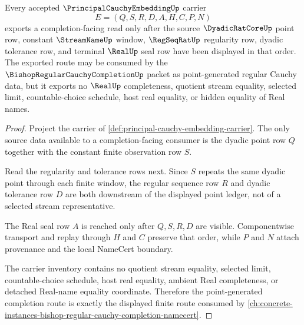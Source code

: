 \begin{theorem}
\label{thm:principal-cauchy-embedding-finite-route}
Every accepted $\PrincipalCauchyEmbeddingUp$ carrier
$$
E=(Q,S,R,D,A,H,C,P,N)
$$
exports a completion-facing read only after the source $\DyadicRatCoreUp$ point row, constant $\StreamNameUp$ window, $\RegSeqRatUp$ regularity row, dyadic tolerance row, and terminal $\RealUp$ seal row have been displayed in that order. The exported route may be consumed by the $\BishopRegularCauchyCompletionUp$ packet as point-generated regular Cauchy data, but it exports no $\RealUp$ completeness, quotient stream equality, selected limit, countable-choice schedule, host real equality, or hidden equality of Real names.
\end{theorem}
\begin{proof}
Project the carrier of \autoref{def:principal-cauchy-embedding-carrier}. The only source data available to a completion-facing consumer is the dyadic point row $Q$ together with the constant finite observation row $S$.

Read the regularity and tolerance rows next. Since $S$ repeats the same dyadic point through each finite window, the regular sequence row $R$ and dyadic tolerance row $D$ are both downstream of the displayed point ledger, not of a selected stream representative.

The Real seal row $A$ is reached only after $Q,S,R,D$ are visible. Componentwise transport and replay through $H$ and $C$ preserve that order, while $P$ and $N$ attach provenance and the local NameCert boundary.

The carrier inventory contains no quotient stream equality, selected limit, countable-choice schedule, host real equality, ambient Real completeness, or detached Real-name equality coordinate. Therefore the point-generated completion route is exactly the displayed finite route consumed by \autoref{ch:concrete-instances-bishop-regular-cauchy-completion-namecert}.
\end{proof}


